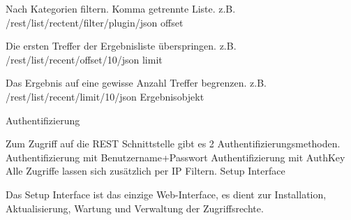Nach Kategorien filtern. Komma getrennte Liste.
z.B. /rest/list/rectent/filter/plugin/json
offset

Die ersten Treffer der Ergebnisliste überspringen.
z.B. /rest/list/recent/offset/10/json
limit

Das Ergebnis auf eine gewisse Anzahl Treffer begrenzen.
z.B. /rest/list/recent/limit/10/json
Ergebnisobjekt

Authentifizierung

Zum Zugriff auf die REST Schnittstelle gibt es 2 Authentifizierungsmethoden.
Authentifizierung mit Benutzername+Passwort
Authentifizierung mit AuthKey
Alle Zugriffe lassen sich zusätzlich per IP Filtern.
Setup Interface

Das Setup Interface ist das einzige Web-Interface, es dient zur Installation, Aktualisierung, Wartung und Verwaltung der Zugriffsrechte.

